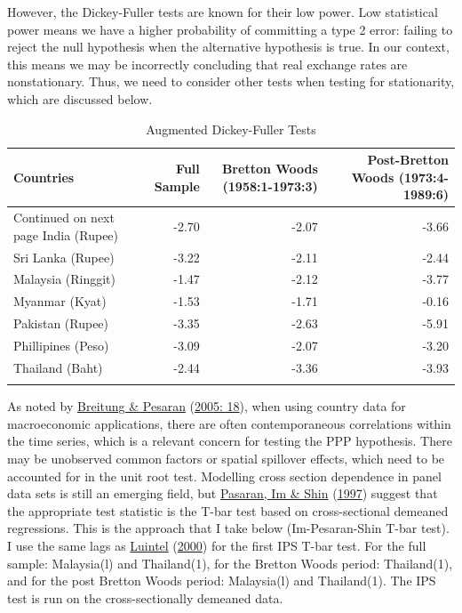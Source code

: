 \documentclass[11pt,preprint, authoryear]{elsarticle}
\numberwithin{equation}{section}
\numberwithin{figure}{section}
\numberwithin{table}{section}
\begin{document}
However, the Dickey-Fuller tests are known for their low power. Low
statistical power means we have a higher probability of committing a
type 2 error: failing to reject the null hypothesis when the alternative
hypothesis is true. In our context, this means we may be incorrectly
concluding that real exchange rates are nonstationary. Thus, we need to
consider other tests when testing for stationarity, which are discussed
below.

\begingroup\fontsize{10pt}{11pt}\selectfont
\begin{longtable}{lrrr}
\caption{Augmented Dickey-Fuller Tests} \\ 
  \toprule
Countries & Full Sample & Bretton Woods (1958:1-1973:3) & Post-Bretton Woods (1973:4-1989:6) \\ 
  \hline 
\endhead 
\hline 
{\footnotesize Continued on next page} 
\endfoot 
\endlastfoot 
 \midrule
India (Rupee) & -2.70 & -2.07 & -3.66 \\ 
  Sri Lanka (Rupee) & -3.22 & -2.11 & -2.44 \\ 
  Malaysia (Ringgit) & -1.47 & -2.12 & -3.77 \\ 
  Myanmar (Kyat) & -1.53 & -1.71 & -0.16 \\ 
  Pakistan (Rupee) & -3.35 & -2.63 & -5.91 \\ 
  Phillipines (Peso) & -3.09 & -2.07 & -3.20 \\ 
  Thailand (Baht) & -2.44 & -3.36 & -3.93 \\ 
   \bottomrule
\label{ADF}
\end{longtable}
\endgroup

As noted by \protect\hyperlink{ref-pes}{Breitung \& Pesaran}
(\protect\hyperlink{ref-pes}{2005: 18}), when using country data for
macroeconomic applications, there are often contemporaneous correlations
within the time series, which is a relevant concern for testing the PPP
hypothesis. There may be unobserved common factors or spatial spillover
effects, which need to be accounted for in the unit root test. Modelling
cross section dependence in panel data sets is still an emerging field,
but \protect\hyperlink{ref-im}{Pasaran, Im \& Shin}
(\protect\hyperlink{ref-im}{1997}) suggest that the appropriate test
statistic is the T-bar test based on cross-sectional demeaned
regressions. This is the approach that I take below (Im-Pesaran-Shin
T-bar test). I use the same lags as \protect\hyperlink{ref-Kul}{Luintel}
(\protect\hyperlink{ref-Kul}{2000}) for the first IPS T-bar test. For
the full sample: Malaysia(l) and Thailand(1), for the Bretton Woods
period: Thailand(1), and for the post Bretton Woods period: Malaysia(l)
and Thailand(1). The IPS test is run on the cross-sectionally demeaned
data.
\end{document}
